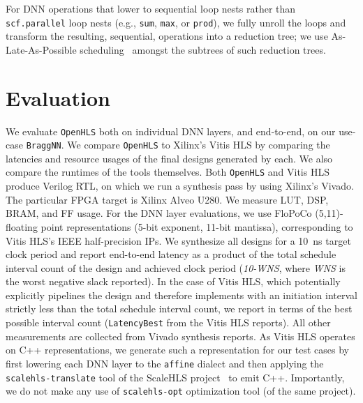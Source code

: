 \documentclass[10pt]{sig-alternate}
\begin{document}
For DNN operations that lower to sequential loop nests rather than \texttt{scf.parallel} loop nests (e.g., \texttt{sum}, \texttt{max},
or \texttt{prod}), we fully unroll the loops and transform the resulting,
sequential, operations into a reduction tree; we use As-Late-As-Possible
scheduling~\cite{baruch1996scheduling} amongst the subtrees of such
reduction trees.

\section{Evaluation}\label{sec:Evaluation}

We evaluate \texttt{OpenHLS} both on individual DNN layers, and end-to-end,
on our use-case \texttt{BraggNN}. We compare \texttt{OpenHLS} to
Xilinx's Vitis HLS by comparing the latencies and resource usages
of the final designs generated by each. We also compare the runtimes
of the tools themselves. Both \texttt{OpenHLS} and Vitis HLS produce
Verilog RTL, on which we run a synthesis pass by using Xilinx's Vivado.
The particular FPGA target is Xilinx Alveo U280. We measure LUT, DSP,
BRAM, and FF usage. For the DNN layer evaluations, we use FloPoCo
(5,11)-floating point representations (5-bit
exponent, 11-bit mantissa), corresponding to Vitis HLS's
IEEE half-precision IPs. We synthesize all designs for a 10~ns target
clock period and report end-to-end latency as a product of the total
schedule interval count of the design and achieved clock period (\emph{10-WNS},
where \emph{WNS} is the worst negative slack reported). In the case
of Vitis HLS, which potentially explicitly pipelines the design and
therefore implements with an initiation interval strictly less than
the total schedule interval count, we report in terms of the best
possible interval count (\texttt{LatencyBest} from the Vitis HLS reports).
All other measurements are collected from Vivado synthesis reports.
As Vitis HLS operates on C++ representations, we generate
such a representation for our test cases by first lowering each DNN
layer to the \texttt{affine} dialect and then applying the \texttt{scalehls-translate}
tool of the ScaleHLS project~\cite{yehpca2022scalehls} to emit C++.
Importantly, we do not make any use of \texttt{scalehls-opt} optimization
tool (of the same project).
\end{document}
